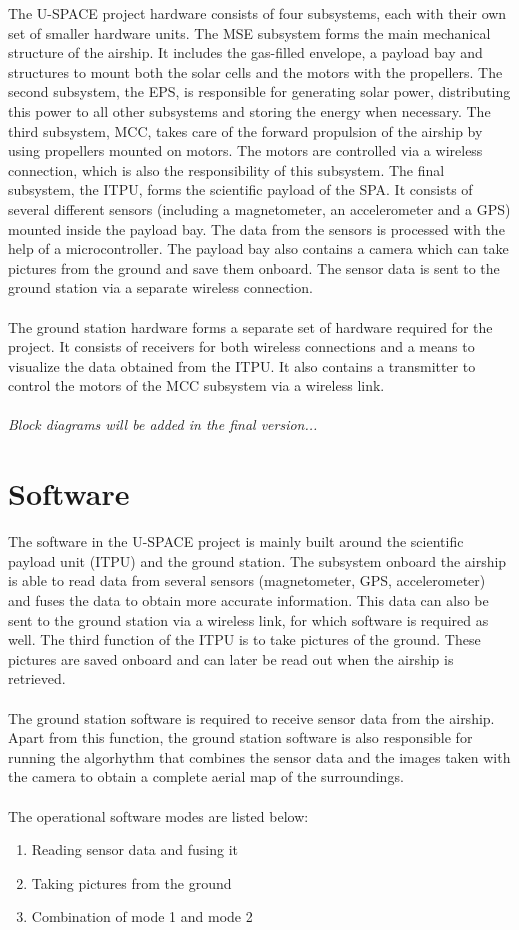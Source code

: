 The \ac{U-SPACE} project hardware consists of four subsystems, each with their own set of smaller hardware units. The \ac{MSE} subsystem forms the main mechanical structure of the airship. It includes the gas-filled envelope, a payload bay and structures to mount both the solar cells and the motors with the propellers. The second subsystem, the \ac{EPS}, is responsible for generating solar power, distributing this power to all other subsystems and storing the energy when necessary. The third subsystem, \ac{MCC}, takes care of the forward propulsion of the airship by using propellers mounted on motors. The motors are controlled via a wireless connection, which is also the responsibility of this subsystem. The final subsystem, the \ac{ITPU}, forms the scientific payload of the \ac{SPA}. It consists of several different sensors (including a magnetometer, an accelerometer and a GPS) mounted inside the payload bay. The data from the sensors is processed with the help of a microcontroller. The payload bay also contains a camera which can take pictures from the ground and save them onboard. The sensor data is sent to the ground station via a separate wireless connection.
\\
\\
The ground station hardware forms a separate set of hardware required for the project. It consists of receivers for both wireless connections and a means to visualize the data obtained from the \ac{ITPU}. It also contains a transmitter to control the motors of the \ac{MCC} subsystem via a wireless link.
\\
\\
\textit{Block diagrams will be added in the final version...}

\section{Software}
\label{sec:intro_software}

The software in the \ac{U-SPACE} project is mainly built around the scientific payload unit (\ac{ITPU}) and the ground station. The subsystem onboard the airship is able to read data from several sensors (magnetometer, GPS, accelerometer) and fuses the data to obtain more accurate information. This data can also be sent to the ground station via a wireless link, for which software is required as well. The third function of the \ac{ITPU} is to take pictures of the ground. These pictures are saved onboard and can later be read out when the airship is retrieved.
\\
\\
The ground station software is required to receive sensor data from the airship. Apart from this function, the ground station software is also responsible for running the algorhythm that combines the sensor data and the images taken with the camera to obtain a complete aerial map of the surroundings.
\\
\\
The operational software modes are listed below:

\begin{enumerate}
\item Reading sensor data and fusing it
\item Taking pictures from the ground
\item Combination of mode 1 and mode 2
\end{enumerate}
